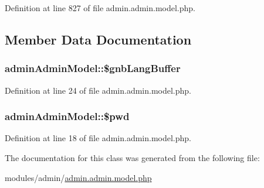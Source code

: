 Definition at line 827 of file admin.\+admin.\+model.\+php.



\subsection{Member Data Documentation}
\subsubsection[{\texorpdfstring{\$gnb\+Lang\+Buffer}{$gnbLangBuffer}}]{\setlength{\rightskip}{0pt plus 5cm}admin\+Admin\+Model\+::\$gnb\+Lang\+Buffer}\hypertarget{classadminAdminModel_acd5e0dd59b6eb5c0df5638247797c799}{}\label{classadminAdminModel_acd5e0dd59b6eb5c0df5638247797c799}


Definition at line 24 of file admin.\+admin.\+model.\+php.

\subsubsection[{\texorpdfstring{\$pwd}{$pwd}}]{\setlength{\rightskip}{0pt plus 5cm}admin\+Admin\+Model\+::\$pwd}\hypertarget{classadminAdminModel_a0c3f3a9ef22f7f5b6ed159a11d8d8e45}{}\label{classadminAdminModel_a0c3f3a9ef22f7f5b6ed159a11d8d8e45}


Definition at line 18 of file admin.\+admin.\+model.\+php.



The documentation for this class was generated from the following file\+:\begin{DoxyCompactItemize}
\item 
modules/admin/\hyperlink{admin_8admin_8model_8php}{admin.\+admin.\+model.\+php}\end{DoxyCompactItemize}
